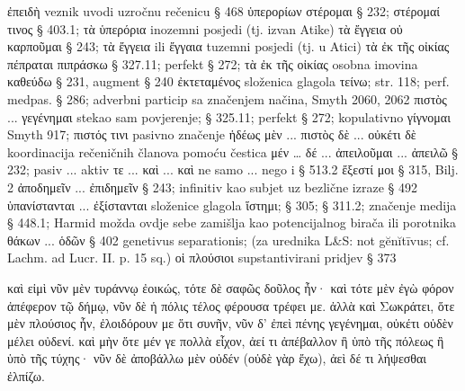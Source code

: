 \begin{description}[noitemsep]
ἐπειδὴ	veznik uvodi uzročnu rečenicu § 468
ὑπερορίων στέρομαι	§ 232; στέρομαί τινος § 403.1; τὰ ὑπερόρια inozemni posjedi (tj. izvan Atike)
τὰ ἔγγεια οὐ καρποῦμαι	§ 243; τὰ ἔγγεια ili ἔγγαια tuzemni posjedi (tj. u Atici)
τὰ ἐκ τῆς οἰκίας πέπραται	πιπράσκω § 327.11; perfekt § 272; τὰ ἐκ τῆς οἰκίας osobna imovina
καθεύδω	§ 231, augment § 240 
ἐκτεταμένος	složenica glagola τείνω; str. 118; perf. medpas. § 286; adverbni particip sa značenjem načina, Smyth 2060, 2062
πιστὸς ... γεγένημαι	stekao sam povjerenje; § 325.11; perfekt § 272; kopulativno γίγνομαι Smyth 917; πιστός τινι pasivno značenje
ἡδέως μὲν ... πιστὸς δὲ ... 
οὐκέτι δὲ	koordinacija rečeničnih članova pomoću čestica μέν … δέ ...
ἀπειλοῦμαι ... ἀπειλῶ	§ 232; pasiv ... aktiv
τε ... καὶ ... καὶ 	ne samo ... nego i § 513.2 
ἔξεστί μοι	§ 315, Bilj. 2
ἀποδημεῖν ... ἐπιδημεῖν	§ 243; infinitiv kao subjet uz bezlične izraze § 492
ὑπανίστανται ... ἐξίστανται 	složenice glagola ἵστημι; § 305; § 311.2; značenje medija § 448.1; Harmid možda ovdje sebe zamišlja kao potencijalnog birača ili porotnika
θάκων ... ὁδῶν	§ 402 genetivus separationis; (za urednika L&S: not gĕnĭtīvus; cf. Lachm. ad Lucr. II. p. 15 sq.)
οἱ πλούσιοι	supstantivirani pridjev § 373
\end{description}


{\large
\begin{greek}
\noindent καὶ εἰμὶ νῦν μὲν τυράννῳ ἐοικώς, 
τότε δὲ 
σαφῶς δοῦλος ἦν· 
καὶ τότε μὲν ἐγὼ 
φόρον ἀπέφερον τῷ δήμῳ, 
νῦν δὲ ἡ πόλις 
τέλος φέρουσα 
τρέφει με. 
ἀλλὰ καὶ Σωκράτει, 
ὅτε μὲν πλούσιος ἦν, 
ἐλοιδόρουν με 
ὅτι συνῆν, 
νῦν δ' 
ἐπεὶ πένης γεγένημαι, 
οὐκέτι οὐδὲν μέλει οὐδενί. 
καὶ μὴν 
ὅτε μέν γε πολλὰ εἶχον, 
ἀεί τι ἀπέβαλλον 
ἢ ὑπὸ τῆς πόλεως 
ἢ ὑπὸ τῆς τύχης· 
νῦν δὲ 
ἀποβάλλω μὲν οὐδέν 
(οὐδὲ γὰρ ἔχω), 
ἀεὶ δέ τι λήψεσθαι 
ἐλπίζω.

\end{greek}
}

